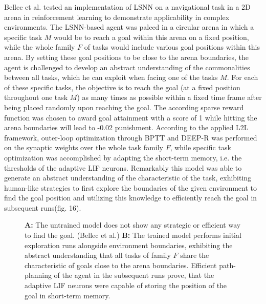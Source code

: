\documentclass[letterpaper, 10 pt, conference]{ieeeconf}  %
\begin{document}
Bellec et al.\cite{bellecLongShorttermMemory2018} tested an implementation of LSNN on a navigational task in a 
2D arena in reinforcement learning to demonstrate applicability in 
complex environments. The LSNN-based agent was palced in a circular arena in which a specific task $M$ would be to reach a goal within this arena
on a fixed position, while the whole family $F$ of tasks would include various goal positions within this arena. By setting these goal positions 
to be close to the arena boundaries, the agent is challenged to develop an abstract understanding of the commonalities between all tasks, 
which he can exploit when facing one of the tasks $M$. For each of these specific tasks, the objective is 
to reach the goal (at a fixed position throughout one task $M$) as many times as possible within a fixed time frame after being placed randomly
upon reaching the goal. The according sparse reward function was chosen to award goal attainment with a score of 1 while hitting the arena
boundaries will lead to -0.02 punishment. According to the applied L2L framework, outer-loop optimization through BPTT and DEEP-R was performed on the
synaptic weights over the whole task family $F$, while specific task optimization was accomplished by 
adapting the short-term memory, i.e. the thresholds of the adaptive LIF neurons. Remarkably this model was able to generate an abstract understanding
of the characteristic of the task, exhibiting human-like strategies to first explore the boundaries of the given environment to find the goal 
position and utilizing this knowledge to efficiently reach the goal in subsequent runs(fig. 16). 
\begin{figure}[thpb]
        \centering
\caption{\textbf{A:} The untrained model does not show any strategic or efficient way to find the goal. (Bellec et al.) \newline
\textbf{B:} The trained model performs initial exploration runs alongside environment boundaries, exhibiting the abstract understanding
that all tasks of family $F$ share the characteristic of goals close to the arena boundaries. Efficient path-planning of the agent 
in the subsequent runs prove, that the adaptive LIF neurons were capable of storing the position of the goal in short-term memory. 
\cite{bellecLongShorttermMemory2018}}
        \label{figurelabel}
        \end{figure}
        
\end{document}
